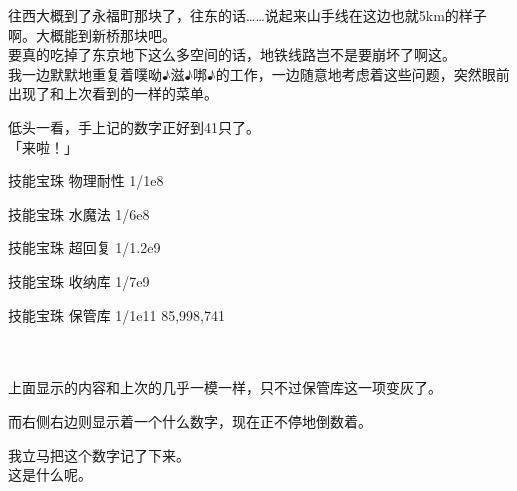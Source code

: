 往西大概到了永福町那块了，往东的话……说起来山手线在这边也就5km的样子啊。大概能到新桥那块吧。\\

要真的吃掉了东京地下这么多空间的话，地铁线路岂不是要崩坏了啊这。\\

我一边默默地重复着噗呦♪滋♪𠳐♪的工作，一边随意地考虑着这些问题，突然眼前出现了和上次看到的一样的菜单。

低头一看，手上记的数字正好到41只了。\\

「来啦！」\\

\cardline

  技能宝珠	物理耐性			1/1e8

  技能宝珠	水魔法		1/6e8

  技能宝珠	超回复		1/1.2e9

  技能宝珠	收纳库		1/7e9

  技能宝珠	保管库		1/1e11	85,998,741

\cardline\\\\

上面显示的内容和上次的几乎一模一样，只不过保管库这一项变灰了。

而右侧右边则显示着一个什么数字，现在正不停地倒数着。

我立马把这个数字记了下来。\\

这是什么呢。

